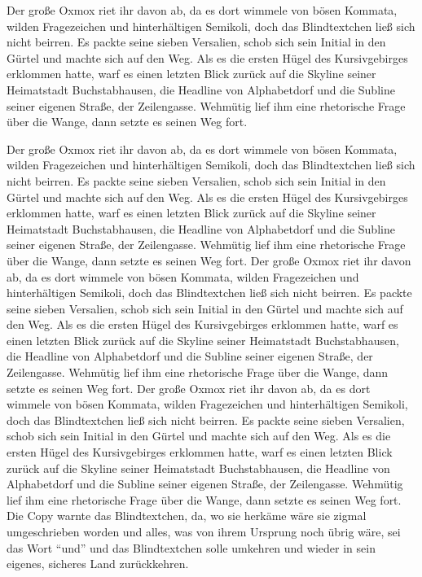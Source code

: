 \documentclass[%
	12pt,%
	a4paper,%
	oneside,%
	listof=totoc, index=totoc, bibliography=totoc, %
	parskip=half,%
	chapterprefix=false,%
	appendixprefix, %
	headings=small,%
	captions=tableheading,%
]{scrreprt}
\begin{document}
Der große Oxmox riet ihr davon ab, da es dort wimmele von bösen Kommata, wilden Fragezeichen und hinterhältigen Semikoli, doch das Blindtextchen ließ sich nicht beirren. Es packte seine sieben Versalien, schob sich sein Initial in den Gürtel und machte sich auf den Weg. Als es die ersten Hügel des Kursivgebirges erklommen hatte, warf es einen letzten Blick zurück auf die Skyline seiner Heimatstadt Buchstabhausen, die Headline von Alphabetdorf und die Subline seiner eigenen Straße, der Zeilengasse. Wehmütig lief ihm eine rhetorische Frage über die Wange, dann setzte es seinen Weg fort.

Der große Oxmox riet ihr davon ab, da es dort wimmele von bösen Kommata, wilden Fragezeichen und hinterhältigen Semikoli, doch das Blindtextchen ließ sich nicht beirren. Es packte seine sieben Versalien, schob sich sein Initial in den Gürtel und machte sich auf den Weg. Als es die ersten Hügel des Kursivgebirges erklommen hatte, warf es einen letzten Blick zurück auf die Skyline seiner Heimatstadt Buchstabhausen, die Headline von Alphabetdorf und die Subline seiner eigenen Straße, der Zeilengasse. Wehmütig lief ihm eine rhetorische Frage über die Wange, dann setzte es seinen Weg fort. Der große Oxmox riet ihr davon ab, da es dort wimmele von bösen Kommata, wilden Fragezeichen und hinterhältigen Semikoli, doch das Blindtextchen ließ sich nicht beirren. Es packte seine sieben Versalien, schob sich sein Initial in den Gürtel und machte sich auf den Weg. Als es die ersten Hügel des Kursivgebirges erklommen hatte, warf es einen letzten Blick zurück auf die Skyline seiner Heimatstadt Buchstabhausen, die Headline von Alphabetdorf und die Subline seiner eigenen Straße, der Zeilengasse. Wehmütig lief ihm eine rhetorische Frage über die Wange, dann setzte es seinen Weg fort. Der große Oxmox riet ihr davon ab, da es dort wimmele von bösen Kommata, wilden Fragezeichen und hinterhältigen Semikoli, doch das Blindtextchen ließ sich nicht beirren. Es packte seine sieben Versalien, schob sich sein Initial in den Gürtel und machte sich auf den Weg. Als es die ersten Hügel des Kursivgebirges erklommen hatte, warf es einen letzten Blick zurück auf die Skyline seiner Heimatstadt Buchstabhausen, die Headline von Alphabetdorf und die Subline seiner eigenen Straße, der Zeilengasse. Wehmütig lief ihm eine rhetorische Frage über die Wange, dann setzte es seinen Weg fort. Die Copy warnte das Blindtextchen, da, wo sie herkäme wäre sie zigmal umgeschrieben worden und alles, was von ihrem Ursprung noch übrig wäre, sei das Wort "`und"'  und das Blindtextchen solle umkehren und wieder in sein eigenes, sicheres Land zurückkehren.
\end{document}
